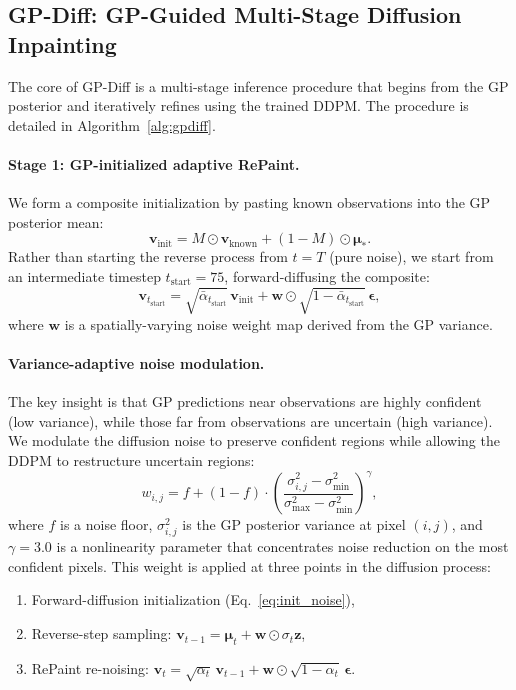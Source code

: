 \documentclass{article}
\begin{document}
\subsection{GP-Diff: GP-Guided Multi-Stage Diffusion Inpainting}
\label{sec:gpdiff}

The core of GP-Diff is a multi-stage inference procedure that begins from the GP posterior and iteratively refines using the trained DDPM. The procedure is detailed in Algorithm~\ref{alg:gpdiff}.

\paragraph{Stage 1: GP-initialized adaptive RePaint.}
We form a composite initialization by pasting known observations into the GP posterior mean:
\begin{equation}
    \mathbf{v}_{\text{init}} = M \odot \mathbf{v}_{\text{known}} + (1 - M) \odot \boldsymbol{\mu}_*. \label{eq:composite}
\end{equation}
Rather than starting the reverse process from $t = T$ (pure noise), we start from an intermediate timestep $t_{\text{start}} = 75$, forward-diffusing the composite:
\begin{equation}
    \mathbf{v}_{t_{\text{start}}} = \sqrt{\bar\alpha_{t_{\text{start}}}}\, \mathbf{v}_{\text{init}} + \mathbf{w} \odot \sqrt{1 - \bar\alpha_{t_{\text{start}}}}\, \boldsymbol{\epsilon},
    \label{eq:init_noise}
\end{equation}
where $\mathbf{w}$ is a spatially-varying noise weight map derived from the GP variance.

\paragraph{Variance-adaptive noise modulation.}
The key insight is that GP predictions near observations are highly confident (low variance), while those far from observations are uncertain (high variance). We modulate the diffusion noise to preserve confident regions while allowing the DDPM to restructure uncertain regions:
\begin{equation}
    w_{i,j} = f + (1 - f) \cdot \left(\frac{\sigma^2_{i,j} - \sigma^2_{\min}}{\sigma^2_{\max} - \sigma^2_{\min}}\right)^\gamma,
    \label{eq:weight}
\end{equation}
where $f$ is a noise floor, $\sigma^2_{i,j}$ is the GP posterior variance at pixel $(i,j)$, and $\gamma = 3.0$ is a nonlinearity parameter that concentrates noise reduction on the most confident pixels. This weight is applied at three points in the diffusion process:
\begin{enumerate}
    \item Forward-diffusion initialization (Eq.~\ref{eq:init_noise}),
    \item Reverse-step sampling: $\mathbf{v}_{t-1} = \boldsymbol{\mu}_t + \mathbf{w} \odot \sigma_t \mathbf{z}$,
    \item RePaint re-noising: $\mathbf{v}_t = \sqrt{\alpha_t}\,\mathbf{v}_{t-1} + \mathbf{w} \odot \sqrt{1-\alpha_t}\,\boldsymbol{\epsilon}$.
\end{enumerate}
\end{document}
